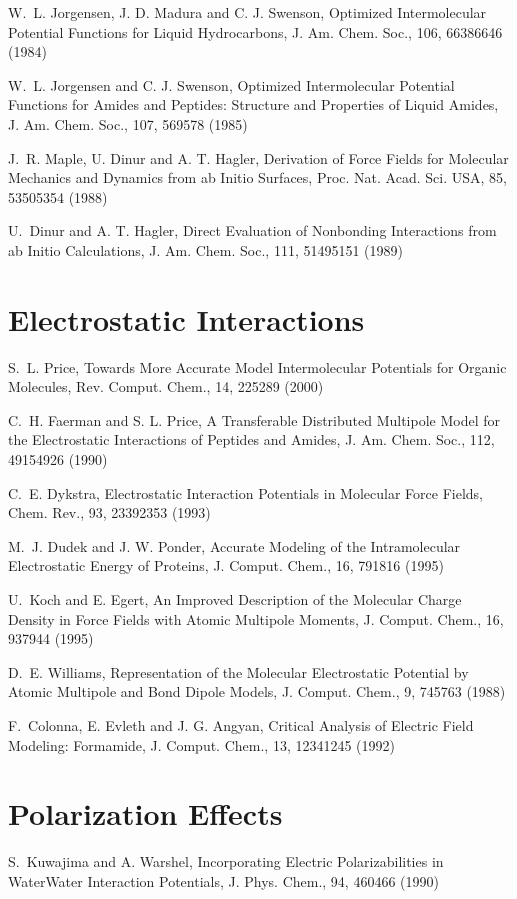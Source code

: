 \documentclass[letterpaper,11pt,english]{sphinxmanual}
\begin{document}
W. L. Jorgensen, J. D. Madura and C. J. Swenson, Optimized Intermolecular Potential Functions for Liquid Hydrocarbons, J. Am. Chem. Soc., 106, 6638\sphinxhyphen{}6646 (1984)

W. L. Jorgensen and C. J. Swenson, Optimized Intermolecular Potential Functions for Amides and Peptides: Structure and Properties of Liquid Amides, J. Am. Chem. Soc., 107, 569\sphinxhyphen{}578 (1985)

J. R. Maple, U. Dinur and A. T. Hagler, Derivation of Force Fields for Molecular Mechanics and Dynamics from ab Initio Surfaces, Proc. Nat. Acad. Sci. USA, 85, 5350\sphinxhyphen{}5354 (1988)

U. Dinur and A. T. Hagler, Direct Evaluation of Nonbonding Interactions from ab Initio Calculations, J. Am. Chem. Soc., 111, 5149\sphinxhyphen{}5151 (1989)


\section{Electrostatic Interactions}
\label{\detokenize{text/references:electrostatic-interactions}}
S. L. Price, Towards More Accurate Model Intermolecular Potentials for Organic Molecules, Rev. Comput. Chem., 14, 225\sphinxhyphen{}289 (2000)

C. H. Faerman and S. L. Price, A Transferable Distributed Multipole Model for the Electrostatic Interactions of Peptides and Amides, J. Am. Chem. Soc., 112, 4915\sphinxhyphen{}4926 (1990)

C. E. Dykstra, Electrostatic Interaction Potentials in Molecular Force Fields, Chem. Rev., 93, 2339\sphinxhyphen{}2353 (1993)

M. J. Dudek and J. W. Ponder, Accurate Modeling of the Intramolecular Electrostatic Energy of Proteins, J. Comput. Chem., 16, 791\sphinxhyphen{}816 (1995)

U. Koch and E. Egert, An Improved Description of the Molecular Charge Density in Force Fields with Atomic Multipole Moments, J. Comput. Chem., 16, 937\sphinxhyphen{}944 (1995)

D. E. Williams, Representation of the Molecular Electrostatic Potential by Atomic Multipole and Bond Dipole Models, J. Comput. Chem., 9, 745\sphinxhyphen{}763 (1988)

F. Colonna, E. Evleth and J. G. Angyan, Critical Analysis of Electric Field Modeling: Formamide, J. Comput. Chem., 13, 1234\sphinxhyphen{}1245 (1992)


\section{Polarization Effects}
\label{\detokenize{text/references:polarization-effects}}
S. Kuwajima and A. Warshel, Incorporating Electric Polarizabilities in Water\sphinxhyphen{}Water Interaction Potentials, J. Phys. Chem., 94, 460\sphinxhyphen{}466 (1990)
\end{document}

